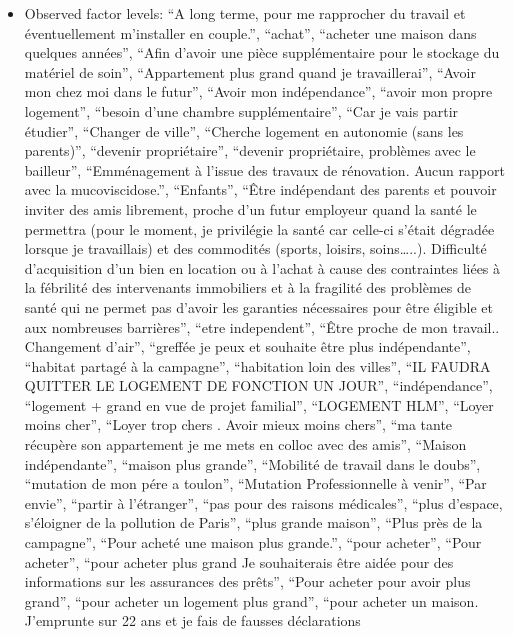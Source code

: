 \documentclass[
  letterpaper,
  DIV=11,
  numbers=noendperiod]{scrartcl}
\providecommand{\tightlist}{%
  \setlength{\itemsep}{0pt}\setlength{\parskip}{0pt}}
\begin{document}
\begin{itemize}
\tightlist
\item
  Observed factor levels: ``A long terme, pour me rapprocher du travail
  et éventuellement m'installer en couple.'', ``achat'', ``acheter une
  maison dans quelques années'', ``Afin d'avoir une pièce supplémentaire
  pour le stockage du matériel de soin'', ``Appartement plus grand quand
  je travaillerai'', ``Avoir mon chez moi dans le futur'', ``Avoir mon
  indépendance'', ``avoir mon propre logement'', ``besoin d'une chambre
  supplémentaire'', ``Car je vais partir étudier'', ``Changer de
  ville'', ``Cherche logement en autonomie (sans les parents)'',
  ``devenir propriétaire'', ``devenir propriétaire, problèmes avec le
  bailleur'', ``Emménagement à l'issue des travaux de rénovation. Aucun
  rapport avec la mucoviscidose.'', ``Enfants'', ``Être indépendant des
  parents et pouvoir inviter des amis librement, proche d'un futur
  employeur quand la santé le permettra (pour le moment, je privilégie
  la santé car celle-ci s'était dégradée lorsque je travaillais) et des
  commodités (sports, loisirs, soins\ldots..). Difficulté d'acquisition
  d'un bien en location ou à l'achat à cause des contraintes liées à la
  fébrilité des intervenants immobiliers et à la fragilité des problèmes
  de santé qui ne permet pas d'avoir les garanties nécessaires pour être
  éligible et aux nombreuses barrières'', ``etre independent'', ``Être
  proche de mon travail.. Changement d'air'', ``greffée je peux et
  souhaite être plus indépendante'', ``habitat partagé à la campagne'',
  ``habitation loin des villes'', ``IL FAUDRA QUITTER LE LOGEMENT DE
  FONCTION UN JOUR'', ``indépendance'', ``logement + grand en vue de
  projet familial'', ``LOGEMENT HLM'', ``Loyer moins cher'', ``Loyer
  trop chers . Avoir mieux moins chers'', ``ma tante récupère son
  appartement je me mets en colloc avec des amis'', ``Maison
  indépendante'', ``maison plus grande'', ``Mobilité de travail dans le
  doubs'', ``mutation de mon pére a toulon'', ``Mutation Professionnelle
  à venir'', ``Par envie'', ``partir à l'étranger'', ``pas pour des
  raisons médicales'', ``plus d'espace, s'éloigner de la pollution de
  Paris'', ``plus grande maison'', ``Plus près de la campagne'', ``Pour
  acheté une maison plus grande.'', ``pour acheter'', ``Pour acheter'',
  ``pour acheter plus grand Je souhaiterais être aidée pour des
  informations sur les assurances des prêts'', ``Pour acheter pour avoir
  plus grand'', ``pour acheter un logement plus grand'', ``pour acheter
  un maison. J'emprunte sur 22 ans et je fais de fausses déclarations

\end{itemize}
\end{document}

